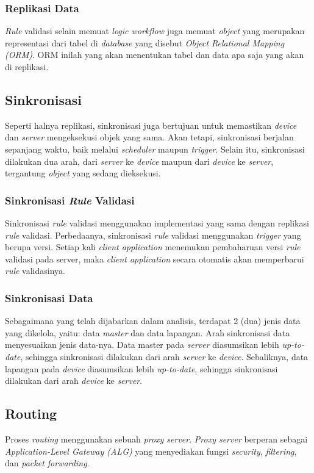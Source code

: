 \subsubsection{Replikasi Data}

\textit{Rule} validasi selain memuat \textit{logic workflow} juga memuat \textit{object} yang merupakan representasi dari tabel di \textit{database} yang disebut \textit{Object Relational Mapping (ORM)}. ORM inilah yang akan menentukan tabel dan data apa saja yang akan di replikasi.


\subsection{Sinkronisasi}

Seperti halnya replikasi, sinkronisasi juga bertujuan untuk memastikan \textit{device} dan \textit{server} mengeksekusi objek yang sama. Akan tetapi, sinkronisasi berjalan sepanjang waktu, baik melalui \textit{scheduler} maupun \textit{trigger}. Selain itu, sinkronisasi dilakukan dua arah, dari \textit{server} ke \textit{device} maupun dari \textit{device} ke \textit{server}, tergantung \textit{object} yang sedang dieksekusi.


\subsubsection{Sinkronisasi \textit{Rule} Validasi}

Sinkronisasi \textit{rule} validasi menggunakan implementasi yang sama dengan replikasi \textit{rule} validasi. Perbedaanya, sinkronisasi \textit{rule} validasi menggunakan \textit{trigger} yang berupa versi. Setiap kali \textit{client application} menemukan pembaharuan versi \textit{rule} validasi pada server, maka \textit{client application} secara otomatis akan memperbarui \textit{rule} validasinya.


\subsubsection{Sinkronisasi Data}

Sebagaimana yang telah dijabarkan dalam analisis, terdapat 2 (dua) jenis data yang dikelola, yaitu: data \textit{master} dan data lapangan. Arah sinkronisasi data menyesuaikan jenis data-nya. Data master pada \textit{server} diasumsikan lebih \textit{up-to-date}, sehingga sinkronisasi dilakukan dari arah \textit{server} ke \textit{device}. Sebaliknya, data lapangan pada \textit{device} diasumsikan lebih \textit{up-to-date}, sehingga sinkronisasi dilakukan dari arah \textit{device} ke \textit{server}.


\subsection{Routing}

Proses \textit{routing} menggunakan sebuah \textit{proxy server}. \textit{Proxy server} berperan sebagai \textit{Application-Level Gateway (ALG)} yang menyediakan fungsi \textit{security}, \textit{filtering}, dan \textit{packet forwarding}. 
